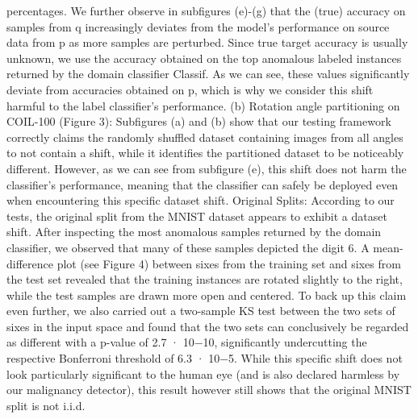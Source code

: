 \documentclass[12pt]{report}
\begin{document}
percentages. We further observe in subfigures (e)-(g) that the (true) accuracy on samples from q increasingly deviates from the model’s performance on source data from p as more samples are perturbed. Since true target accuracy is usually unknown, we use the accuracy obtained on the top anomalous labeled instances returned by the domain classifier Classif. As we can see, these values significantly deviate from accuracies obtained on p, which is why we consider this shift harmful to the label classifier’s performance. (b) Rotation angle partitioning on COIL-100 (Figure 3): Subfigures (a) and (b) show that our testing framework correctly claims the randomly shuffled dataset containing images from all angles to not contain a shift, while it identifies the partitioned dataset to be noticeably different. However, as we can see from subfigure (e), this shift does not harm the classifier’s performance, meaning that the classifier can safely be deployed even when encountering this specific dataset shift. Original Splits: According to our tests, the original split from the MNIST dataset appears to exhibit a dataset shift. After inspecting the most anomalous samples returned by the domain classifier, we observed that many of these samples depicted the digit 6. A mean-difference plot (see Figure 4) between sixes from the training set and sixes from the test set revealed that the training instances are rotated slightly to the right, while the test samples are drawn more open and centered. To back up this claim even further, we also carried out a two-sample KS test between the two sets of sixes in the input space and found that the two sets can conclusively be regarded as different with a p-value of 2.7 · 10−10, significantly undercutting the respective Bonferroni threshold of 6.3 · 10−5. While this specific shift does not look particularly significant to the human eye (and is also declared harmless by our malignancy detector), this result however still shows that the original MNIST split is not i.i.d.





\end{document}
